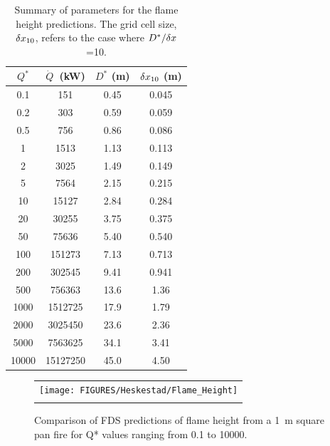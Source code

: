 \begin{table}[h!]
\caption[Summary of parameters for the flame height predictions.]{Summary of parameters for the flame height predictions. The grid cell size, $\delta x_{10}$, refers to the case where $D^*/\delta x$=10.}
\begin{center}
\begin{tabular}{|c|c|c|c|}
\hline
$Q^*$       & $\dot{Q}$~(kW)   & $D^*$ (m)  & $\delta x_{10}$ (m)  \\ \hline \hline
0.1         &   151         & 0.45    &   0.045   \\ \hline
0.2         &   303         & 0.59    &   0.059   \\ \hline
0.5         &   756         & 0.86    &   0.086   \\ \hline
1           &   1513        & 1.13    &   0.113   \\ \hline
2           & 3025          & 1.49    &   0.149   \\ \hline
5           & 7564          & 2.15    &   0.215   \\ \hline
10          &  15127        & 2.84    &   0.284   \\ \hline
20          &  30255        & 3.75    &   0.375   \\ \hline
50          &  75636        & 5.40    &   0.540   \\ \hline
100         &   151273      & 7.13    &   0.713   \\ \hline
200         &   302545      & 9.41    &   0.941   \\ \hline
500         &   756363      & 13.6    &   1.36    \\ \hline
1000        &   1512725     & 17.9    &   1.79    \\ \hline
2000        &   3025450     & 23.6    &   2.36    \\ \hline
5000        &   7563625     & 34.1    &   3.41    \\ \hline
10000       &   15127250    & 45.0    &   4.50    \\ \hline
\end{tabular}
\end{center}
\label{Flame_Height_Parameters}
\end{table}

\newpage

\begin{figure}[p]
\begin{center}
\begin{tabular}{c}
\texttt{[image: FIGURES/Heskestad/Flame\_Height]} \\
\vspace{0.25in} \\
\end{tabular}
\end{center}
\caption[Summary of flame height predictions, Heskestad correlation.]
{Comparison of FDS predictions of flame height from a 1~m square pan fire for Q* values ranging from
0.1 to 10000.}
\label{Flame_Height}
\end{figure}

